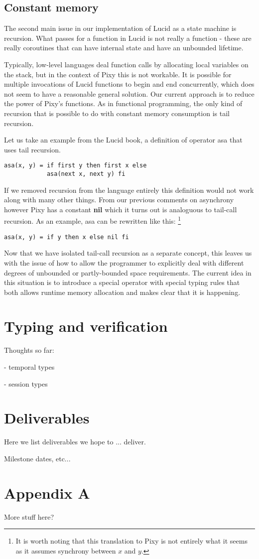 \documentclass{scrartcl}
\begin{document}
    \subsection{Constant memory}
    
    The second main issue in our implementation of Lucid as a state machine is recursion. What passes for a function in Lucid is not really a function - these are really coroutines that can have internal state and have an unbounded lifetime.
    
    Typically, low-level languages deal function calls by allocating local variables on the stack, but in the context of Pixy this is not workable. It is possible for multiple invocations of Lucid functions to begin and end concurrently, which does not seem to have a reasonable general solution. Our current approach is to reduce the power of Pixy's functions. As in functional programming, the only kind of recursion that is possible to do with constant memory consumption is tail recursion.
    
    Let us take an example from the Lucid book, a definition of operator asa that uses tail recursion.
    \begin{lstlisting}
asa(x, y) = if first y then first x else
            asa(next x, next y) fi
    \end{lstlisting}
    
    If we removed recursion from the language entirely this definition would not work along with many other things. From our previous comments on asynchrony however Pixy has a constant \textbf{nil} which it turns out is analoguous to tail-call recursion. As an example, asa can be rewritten like this:
    \footnote{It is worth noting that this translation to Pixy is not entirely what it seems as it assumes synchrony between $x$ and $y$.}
    \begin{lstlisting}
asa(x, y) = if y then x else nil fi
    \end{lstlisting}
    
    Now that we have isolated tail-call recursion as a separate concept, this leaves us with the issue of how to allow the programmer to explicitly deal with different degrees of unbounded or partly-bounded space requirements. The current idea in this situation is to introduce a special operator with special typing rules that both allows runtime memory allocation and makes clear that it is happening.
    
    \section{Typing and verification}
    
    Thoughts so far:
    
    - temporal types
    
    - session types
    
    \section{Deliverables}
    
    Here we list deliverables we hope to ... deliver.
    
    Milestone dates, etc...
    
    \appendix
    
    \section{Appendix A}
    
    More stuff here?
\end{document}
